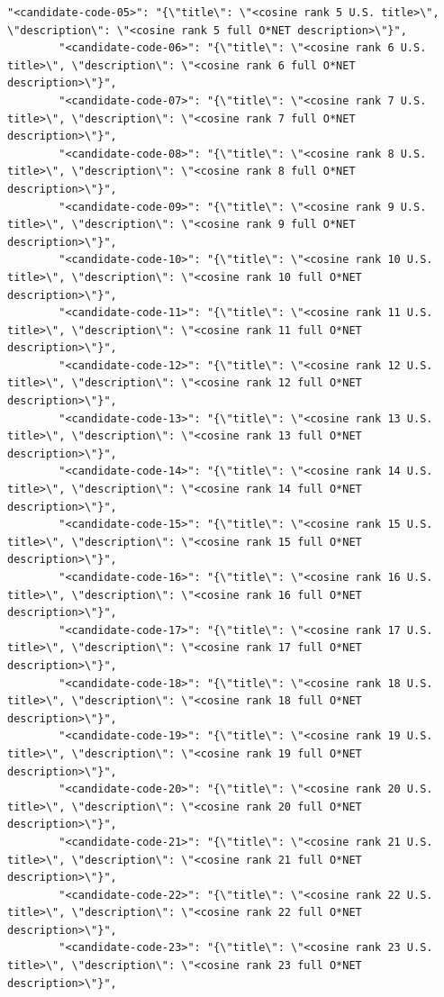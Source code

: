 {\begin{Verbatim}[breaklines=true,breakanywhere=true,fontsize=\footnotesize,baselinestretch=0.95]
        "<candidate-code-05>": "{\"title\": \"<cosine rank 5 U.S. title>\", \"description\": \"<cosine rank 5 full O*NET description>\"}",
        "<candidate-code-06>": "{\"title\": \"<cosine rank 6 U.S. title>\", \"description\": \"<cosine rank 6 full O*NET description>\"}",
        "<candidate-code-07>": "{\"title\": \"<cosine rank 7 U.S. title>\", \"description\": \"<cosine rank 7 full O*NET description>\"}",
        "<candidate-code-08>": "{\"title\": \"<cosine rank 8 U.S. title>\", \"description\": \"<cosine rank 8 full O*NET description>\"}",
        "<candidate-code-09>": "{\"title\": \"<cosine rank 9 U.S. title>\", \"description\": \"<cosine rank 9 full O*NET description>\"}",
        "<candidate-code-10>": "{\"title\": \"<cosine rank 10 U.S. title>\", \"description\": \"<cosine rank 10 full O*NET description>\"}",
        "<candidate-code-11>": "{\"title\": \"<cosine rank 11 U.S. title>\", \"description\": \"<cosine rank 11 full O*NET description>\"}",
        "<candidate-code-12>": "{\"title\": \"<cosine rank 12 U.S. title>\", \"description\": \"<cosine rank 12 full O*NET description>\"}",
        "<candidate-code-13>": "{\"title\": \"<cosine rank 13 U.S. title>\", \"description\": \"<cosine rank 13 full O*NET description>\"}",
        "<candidate-code-14>": "{\"title\": \"<cosine rank 14 U.S. title>\", \"description\": \"<cosine rank 14 full O*NET description>\"}",
        "<candidate-code-15>": "{\"title\": \"<cosine rank 15 U.S. title>\", \"description\": \"<cosine rank 15 full O*NET description>\"}",
        "<candidate-code-16>": "{\"title\": \"<cosine rank 16 U.S. title>\", \"description\": \"<cosine rank 16 full O*NET description>\"}",
        "<candidate-code-17>": "{\"title\": \"<cosine rank 17 U.S. title>\", \"description\": \"<cosine rank 17 full O*NET description>\"}",
        "<candidate-code-18>": "{\"title\": \"<cosine rank 18 U.S. title>\", \"description\": \"<cosine rank 18 full O*NET description>\"}",
        "<candidate-code-19>": "{\"title\": \"<cosine rank 19 U.S. title>\", \"description\": \"<cosine rank 19 full O*NET description>\"}",
        "<candidate-code-20>": "{\"title\": \"<cosine rank 20 U.S. title>\", \"description\": \"<cosine rank 20 full O*NET description>\"}",
        "<candidate-code-21>": "{\"title\": \"<cosine rank 21 U.S. title>\", \"description\": \"<cosine rank 21 full O*NET description>\"}",
        "<candidate-code-22>": "{\"title\": \"<cosine rank 22 U.S. title>\", \"description\": \"<cosine rank 22 full O*NET description>\"}",
        "<candidate-code-23>": "{\"title\": \"<cosine rank 23 U.S. title>\", \"description\": \"<cosine rank 23 full O*NET description>\"}",

\end{Verbatim}}
